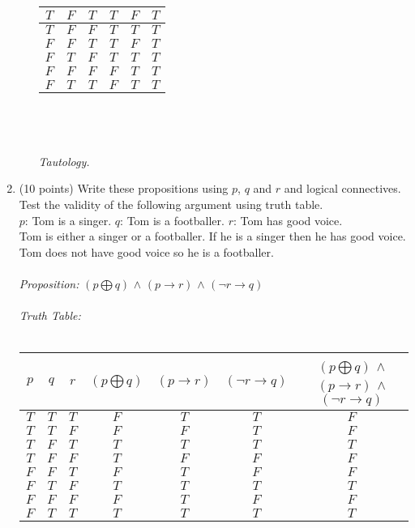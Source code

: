 \documentclass[12pt,fleqn]{article}
\begin{document}
\begin{enumerate}
\begin{enumerate}
\begin{tabular}{ c | c | c | c | c | c}
  $T$ & $F$ & $T$ & $T$ & $F$ &$T$\\ \hline
  $T$ & $F$ & $F$ & $T$ & $T$ &$T$\\ \hline
  $F$ & $F$ & $T$ & $T$ & $F$ &$T$\\ \hline
  $F$ & $T$ & $F$ & $T$ & $T$ &$T$\\ \hline
  $F$ & $F$ & $F$ & $F$ & $T$ &$T$\\ \hline
  $F$ & $T$ & $T$ & $F$ & $T$ &$T$ \\     
\end{tabular}\\\\\ \\
\textit{Tautology.}\\
\end{enumerate}

\item (10 points) Write these propositions using $p$, $q$ and $r$ and logical connectives. Test the validity of the following argument using truth table. \\
$p$: Tom is a singer. \space $q$: Tom is a footballer. \space $r$: Tom has good voice. \\
Tom is either a singer or a footballer. If he is a singer then he has good voice. Tom does not have good voice so he is a footballer. \\\\
\textit{Proposition: } $(p \bigoplus q)$ $\wedge$ $(p \rightarrow r)$ $\wedge$ $(\neg r \rightarrow q)$\\\\
\textit{Truth Table:}\\\\
\begin{tabular}{ c | c | c | c | c | c | c}
  $p$ & $q$ & $r$ & $(p \bigoplus q)$ & $(p \rightarrow r)$ & $(\neg r \rightarrow q)$ & $(p \bigoplus q)$ $\wedge$ $(p \rightarrow r)$ $\wedge$ $(\neg r \rightarrow q)$ \\ \hline
  $T$ & $T$ & $T$ & $F$ & $T$ &$T$ &$F$ \\ \hline
  $T$ & $T$ & $F$ & $F$ & $F$ &$T$ &$F$\\ \hline
  $T$ & $F$ & $T$ & $T$ & $T$ &$T$ &$T$\\ \hline
  $T$ & $F$ & $F$ & $T$ & $F$ &$F$ &$F$\\ \hline
  $F$ & $F$ & $T$ & $F$ & $T$ &$F$ &$F$\\ \hline
  $F$ & $T$ & $F$ & $T$ & $T$ &$T$ &$T$\\ \hline
  $F$ & $F$ & $F$ & $F$ & $T$ &$F$ &$F$\\ \hline
  $F$ & $T$ & $T$ & $T$ & $T$ &$T$ &$T$\\     
\end{tabular}\\\\\ \\


\end{enumerate}
\end{document}
